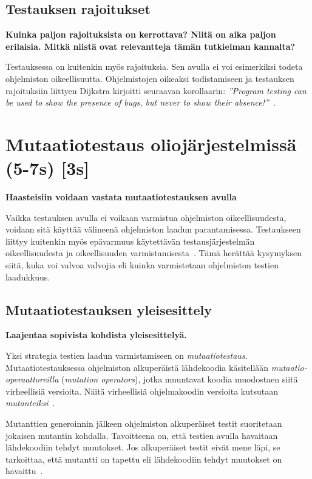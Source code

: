 \documentclass[finnish, grading]{tktltiki2}
\theoremstyle{definition}
\theoremstyle{remark}
\begin{document}
\subsection{Testauksen rajoitukset}

\textbf{Kuinka paljon rajoituksista on kerrottava? Niitä on aika paljon erilaisia. Mitkä niistä ovat relevantteja tämän tutkielman kannalta?}

Testauksessa on kuitenkin myös rajoituksia. Sen avulla ei voi esimerkiksi todeta ohjelmiston oikeellisuutta. Ohjelmistojen oikeaksi todistamiseen ja testauksen rajoituksiin liittyen Dijkstra kirjoitti seuraavan korollaarin: \textit{''Program testing can be used to show the presence of bugs, but never to show their absence!''}~\cite[s. 6]{Dahl:Dijkstra:Hoare:1972}. 

\section{Mutaatiotestaus oliojärjestelmissä (5-7s) [3s]}

\textbf{Haasteisiin voidaan vastata mutaatiotestauksen avulla}

Vaikka testauksen avulla ei voikaan varmistua ohjelmiston oikeellisuudesta, voidaan sitä käyttää välineenä ohjelmiston laadun parantamisessa. Testaukseen liittyy kuitenkin myös epävarmuus käytettävän testausjärjestelmän oikeellisuudesta ja oikeellisuuden varmistamisesta~\cite[s. 209]{Manna:Waldinger:1978}. Tämä herättää kysymyksen siitä, kuka voi valvoa valvojia eli kuinka varmistetaan ohjelmiston testien laadukkuus.

\subsection{Mutaatiotestauksen yleisesittely}

\textbf{Laajentaa sopivista kohdista yleisesittelyä.}

Yksi strategia testien laadun varmistamiseen on \textit{mutaatiotestaus}. Mutaatiotestauksessa ohjelmiston alkuperäistä lähdekoodia käsitellään \textit{mutaatio-operaattoreilla} (\textit{mutation operators}), jotka muuntavat koodia muodostaen siitä virheellisiä versioita. Näitä virheellisiä ohjelmakoodin versioita kutsutaan \textit{mutanteiksi}~\cite[s. 869]{Ma:Harrold:Kwon:2006}. 

Mutanttien generoinnin jälkeen ohjelmiston alkuperäiset testit suoritetaan jokaisen mutantin kohdalla. Tavoitteena on, että testien avulla havaitaan lähdekoodiin tehdyt muutokset. Jos alkuperäiset testit eivät mene läpi, se tarkoittaa, että mutantti on tapettu eli lähdekoodiin tehdyt muutokset on havaittu~\cite[s. 9]{Kim:Clark:McDermid:2000}. 
\end{document}
